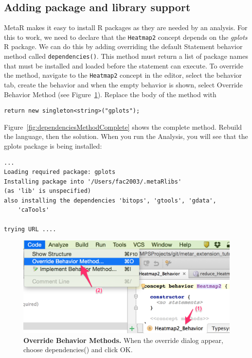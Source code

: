 \subsection{Adding package and library support}
MetaR makes it easy to install R packages as they are needed by an analysis. For this to work, we need to declare that the \texttt{Heatmap2} concept depends on the \textit{gplots} R package.  We can do this by adding overriding the default Statement behavior method called \texttt{dependencies()}. This method must return a list of package names that must be installed and loaded before the statement can execute. To override the method, navigate to the \texttt{Heatmap2} concept in the editor, select the behavior tab, create the behavior and when the empty behavior is shown, select Override Behavior Method (see Figure~\ref{fig:CreateBehaviorAndOverride}).
Replace the body of the method with 
\begin{lstlisting}
return new singleton<string>("gplots");
\end{lstlisting}
Figure~\ref{fig:dependenciesMethodComplete} shows the complete  method. Rebuild the language, then the solution. When you run the Analysis, you will see that the gplots package is being installed:
\begin{lstlisting}
...
Loading required package: gplots
Installing package into '/Users/fac2003/.metaRlibs'
(as 'lib' is unspecified)
also installing the dependencies 'bitops', 'gtools', 'gdata', 
    'caTools'

trying URL ....
\end{lstlisting}

\begin{figure}
  \centering
  \includegraphics[width=\figWidthNarrow]{figures/CreateBehaviorAndOverride.png}
\caption[Override Behavior Methods.]{\textbf{Override Behavior Methods.} When the override dialog appear, choose dependencies() and click OK.}
\label{fig:CreateBehaviorAndOverride}
\end{figure}


